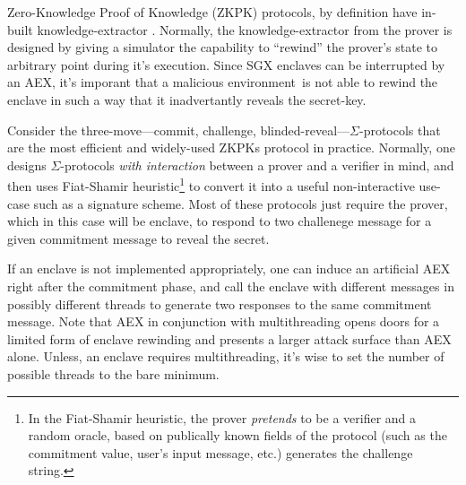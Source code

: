 \documentclass[10pt]{article}
\newcommand{\env}{\textsf{environment}}
\begin{document}
  Zero-Knowledge Proof of Knowledge (ZKPK) protocols, by definition
  have in-built knowledge-extractor \cite{BellarePOK, maurerZKP}. 
  Normally, the knowledge-extractor from the prover is designed by 
  giving a simulator the capability to ``rewind'' the prover's state 
  to arbitrary point during it's execution. Since SGX enclaves can be
  interrupted by an AEX, it's imporant that a malicious \env\ is not
  able to rewind the enclave in such a way that it inadvertantly
  reveals the secret-key.

  Consider the three-move---commit, challenge,
  blinded-reveal---$\Sigma$-protocols \cite{sigmaprotocol} that are
  the most efficient and widely-used ZKPKs protocol in practice.
  Normally, one designs $\Sigma$-protocols \textit{with interaction}
  between a prover and a verifier in mind, and then uses Fiat-Shamir
  \cite{FiatShamir} heuristic\footnote{In the Fiat-Shamir heuristic,
    the prover \textit{pretends} to be a verifier and a
    random oracle, based on publically known fields of the protocol (such
    as the commitment value, user's input message, etc.) generates the
    challenge string.} to convert it into a useful non-interactive
  use-case such as a signature scheme. Most of these protocols just
  require the prover, which in this case will be enclave, to respond 
  to two challenege message for a given commitment message to reveal 
  the secret.

  If an enclave is not implemented appropriately, one can induce an
  artificial AEX right after the commitment phase, and call the enclave 
  with different messages in possibly different threads to generate two
  responses to the same commitment message. Note that AEX in
  conjunction with multithreading opens doors for a limited form of
  enclave rewinding and presents a larger attack surface than AEX
  alone.  Unless, an enclave requires multithreading, it's wise to set
  the number of possible threads to the bare minimum.
\end{document}
